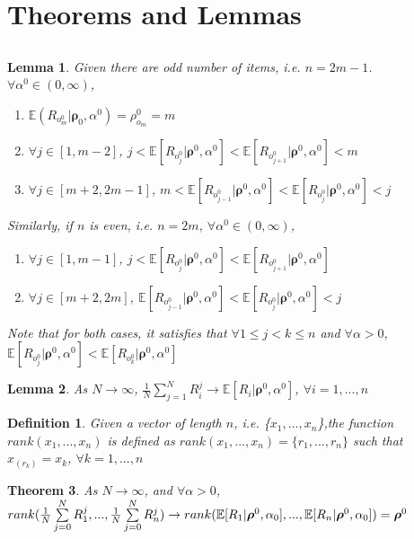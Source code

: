 \documentclass[11pt, oneside]{article}   	%
\newtheorem{theorem}{Theorem}[subsection]
\newtheorem{lemma}[theorem]{Lemma}
\newtheorem{mydef}{Definition}
\begin{document}
\section{Theorems and Lemmas}
\subsection{ }
\begin{lemma}
Given there are odd number of items, i.e. $n = 2m - 1$. $\forall \alpha^0 \in (0, \infty)$,

	\begin{enumerate} 
		\item{$\mathbb{E}(R_{o^0_m}|\bm{\rho}_{0}, \alpha^0) = \rho^0_{o_m} = m$ }
		\item{$\forall j \in [1, m-2]$, $j< \mathbb{E}[R_{o^0_j}|\bm{\rho}^0, \alpha^0] <\mathbb{E}[R_{o^0_{j+1}}|\bm{\rho}^0, \alpha^0] < m$}
		\item{$\forall j \in [m+2, 2m-1]$, $m< \mathbb{E}[R_{o^0_{j-1}}|\bm{\rho}^0, \alpha^0] <\mathbb{E}[R_{o^0_{j}}|\bm{\rho}^0, \alpha^0] < j$}
	\end{enumerate}
Similarly, if $n$ is even, i.e. $n = 2m$,  $\forall \alpha^0 \in (0, \infty)$,
	\begin{enumerate} 
	\item{$\forall j \in [1, m-1]$, $j< \mathbb{E}[R_{o^0_j}|\bm{\rho}^0, \alpha^0] <\mathbb{E}[R_{o^0_{j+1}}|\bm{\rho}^0, \alpha^0]$}
	\item{$\forall j \in [m+2, 2m]$, $\mathbb{E}[R_{o^0_{j-1}}|\bm{\rho}^0, \alpha^0] <\mathbb{E}[R_{o^0_{j}}|\bm{\rho}^0, \alpha^0] < j$}
\end{enumerate}
Note that for both cases, it satisfies that $\forall 1\leq j<k\leq n$ and $\forall \alpha > 0 $,
{$\mathbb{E}[R_{o^0_j}|\bm{\rho}^0, \alpha^0]<\mathbb{E}[R_{o^0_k}|\bm{\rho}^0, \alpha^0]$}
\end{lemma}

\begin{lemma}
 As $N \rightarrow \infty$, $\frac{1}{N}\sum\limits_{j=1}^{N}R^j_i \rightarrow \mathbb{E}[R_i|\bm{\rho}^0, \alpha ^0]$, $\forall i = 1, ..., n$
\end{lemma}

\begin{mydef}
Given a vector of length $n$, i.e. \{$x_1, ..., x_n$\},the function $rank(x_1, ..., x_n)$ is defined as $rank(x_1, ..., x_n) = \{r_1, ..., r_n\}$ such that $x_{(r_k)} = x_k$, $\forall k = 1, ..., n$
\end{mydef} 
\begin{theorem}
As $N \rightarrow \infty$, and $\forall \alpha > 0$, \\ $rank({1\over N}\sum\limits_{j=0}^{N}R_1^j,...,{1\over N}\sum\limits_{j=0}^{N}R_n^j) \rightarrow rank(\mathbb{E}[{R}_1|\bm{\rho}^0, \alpha_0],...,\mathbb{E}[{R}_n|\bm{\rho}^0, \alpha_0]) =\bm{\rho}^0 $
\end{theorem}
\end{document}
